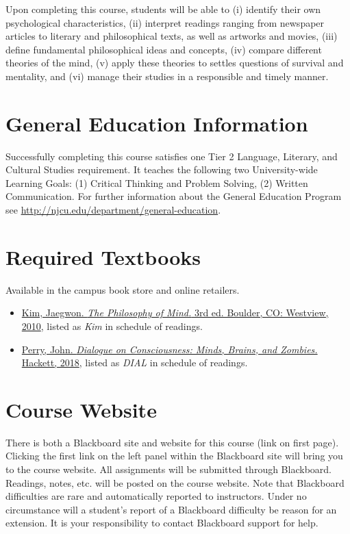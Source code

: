\documentclass[article,oneside]{memoir}
\begin{document}
Upon completing this course, students will be able to  (i) identify their own psychological characteristics, (ii) interpret readings ranging from newspaper articles to literary and philosophical texts, as well as artworks and movies, (iii) define fundamental philosophical ideas and concepts, (iv) compare different theories of the mind, (v) apply these theories to settles questions of survival and mentality,  and  (vi) manage their studies in a responsible and timely manner. 


\section{General Education Information} 
Successfully completing this course satisfies one Tier 2 Language, Literary, and Cultural Studies requirement. It teaches the following two University-wide Learning Goals: (1) Critical Thinking and Problem Solving, (2) Written Communication. For further information about the General Education Program see \href{http://njcu.edu/department/general-education}{http://njcu.edu/department/general-education}.


\section{Required Textbooks}
Available in the campus book store and online retailers.


\begin{itemize}
\item \href{https://www.amazon.com/Philosophy-Mind-Jaegwon-Kim/dp/0813344581/ref=sr_1_1?ie=UTF8&qid=1484684648&sr=8-1&keywords=kim+philosophy+of+mind}{Kim, Jaegwon. \emph{The Philosophy of Mind.} 3rd ed. Boulder, CO: Westview, 2010}, listed as \emph{Kim} in schedule of readings.
\item \href{https://www.amazon.com/Dialogue-Consciousness-Zombies-Philosophical-Dialogues/dp/1624667368/ref=sr_1_1?ie=UTF8&qid=1545172478&sr=8-1&keywords=john+perry+consciousness}{Perry, John. \emph{Dialogue on Consciousness: Minds, Brains, and Zombies.} Hackett, 2018}, listed as \emph{DIAL} in schedule of readings.
\end{itemize}


\section{Course Website}
There is both a Blackboard site and website for this course (link on first page). Clicking the first link on the left panel within the Blackboard site will bring you to the course website. All assignments will be submitted through Blackboard. Readings, notes, etc. will be posted on the course website. Note that Blackboard difficulties are rare and automatically reported to instructors. Under no circumstance will a student's report of a Blackboard difficulty be reason for an extension. It is your responsibility to contact Blackboard support for help.
\end{document}
